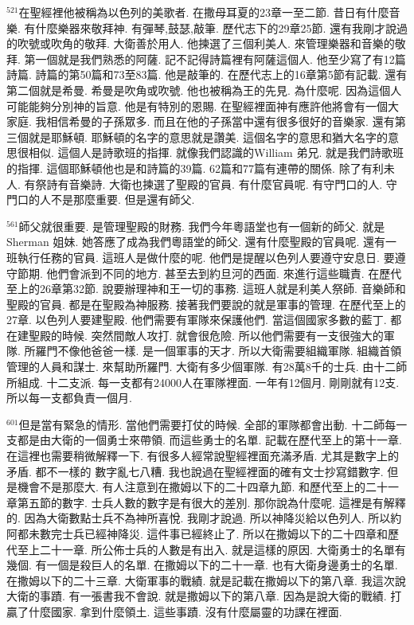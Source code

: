 \documentclass{book}
\begin{document}
$^{521}$在聖經裡他被稱為以色列的美歌者.
在撒母耳夏的23章一至二節.
昔日有什麼音樂.
有什麼樂器來敬拜神.
有彈琴,鼓瑟,敲筆.
歷代志下的29章25節.
還有我剛才說過的吹號或吹角的敬拜.
大衛善於用人.
他揀選了三個利美人.
來管理樂器和音樂的敬拜.
第一個就是我們熟悉的阿薩.
記不記得詩篇裡有阿薩這個人.
他至少寫了有12篇詩篇.
詩篇的第50篇和73至83篇.
他是敲筆的.
在歷代志上的16章第5節有記載.
還有第二個就是希曼.
希曼是吹角或吹號.
他也被稱為王的先見.
為什麼呢.
因為這個人可能能夠分別神的旨意.
他是有特別的恩賜.
在聖經裡面神有應許他將會有一個大家庭.
我相信希曼的子孫眾多.
而且在他的子孫當中還有很多很好的音樂家.
還有第三個就是耶穌頓.
耶穌頓的名字的意思就是讚美.
這個名字的意思和猶大名字的意思很相似.
這個人是詩歌班的指揮.
就像我們認識的William 弟兄.
就是我們詩歌班的指揮.
這個耶穌頓他也是和詩篇的39篇.
62篇和77篇有連帶的關係.
除了有利未人.
有祭詩有音樂詩.
大衛也揀選了聖殿的官員.
有什麼官員呢.
有守門口的人.
守門口的人不是那麼重要.
但是還有師父.

$^{561}$師父就很重要.
是管理聖殿的財務.
我們今年粵語堂也有一個新的師父.
就是Sherman 姐妹.
她答應了成為我們粵語堂的師父.
還有什麼聖殿的官員呢.
還有一班執行任務的官員.
這班人是做什麼的呢.
他們是提醒以色列人要遵守安息日.
要遵守節期.
他們會派到不同的地方.
甚至去到約旦河的西面.
來進行這些職責.
在歷代至上的26章第32節.
說要辦理神和王一切的事務.
這班人就是利美人祭師.
音樂師和聖殿的官員.
都是在聖殿為神服務.
接著我們要說的就是軍事的管理.
在歷代至上的27章.
以色列人要建聖殿.
他們需要有軍隊來保護他們.
當這個國家多數的藍丁.
都在建聖殿的時候.
突然間敵人攻打.
就會很危險.
所以他們需要有一支很強大的軍隊.
所羅門不像他爸爸一樣.
是一個軍事的天才.
所以大衛需要組織軍隊.
組織首領管理的人員和謀士.
來幫助所羅門.
大衛有多少個軍隊.
有28萬8千的士兵.
由十二師所組成.
十二支派.
每一支都有24000人在軍隊裡面.
一年有12個月.
剛剛就有12支.
所以每一支都負責一個月.

$^{601}$但是當有緊急的情形.
當他們需要打仗的時候.
全部的軍隊都會出動.
十二師每一支都是由大衛的一個勇士來帶領.
而這些勇士的名單.
記載在歷代至上的第十一章.
在這裡也需要稍微解釋一下.
有很多人經常說聖經裡面充滿矛盾.
尤其是數字上的矛盾.
都不一樣的 數字亂七八糟.
我也說過在聖經裡面的確有文士抄寫錯數字.
但是機會不是那麼大.
有人注意到在撒姆以下的二十四章九節.
和歷代至上的二十一章第五節的數字.
士兵人數的數字是有很大的差別.
那你說為什麼呢.
這裡是有解釋的.
因為大衛數點士兵不為神所喜悅.
我剛才說過.
所以神降災給以色列人.
所以約阿都未數完士兵已經神降災.
這件事已經終止了.
所以在撒姆以下的二十四章和歷代至上二十一章.
所公佈士兵的人數是有出入.
就是這樣的原因.
大衛勇士的名單有幾個.
有一個是殺巨人的名單.
在撒姆以下的二十一章.
也有大衛身邊勇士的名單.
在撒姆以下的二十三章.
大衛軍事的戰績.
就是記載在撒姆以下的第八章.
我這次說大衛的事蹟.
有一張書我不會說.
就是撒姆以下的第八章.
因為是說大衛的戰績.
打贏了什麼國家.
拿到什麼領土.
這些事蹟.
沒有什麼屬靈的功課在裡面.
\end{document}
